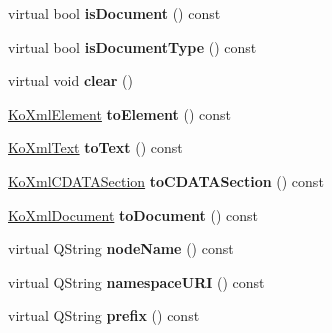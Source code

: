 \begin{DoxyCompactItemize}
\item 
\hypertarget{classKoXmlNode_a72089a94f37917bdc8896368c83c75dd}{
virtual bool {\bfseries isDocument} () const }
\label{classKoXmlNode_a72089a94f37917bdc8896368c83c75dd}

\item 
\hypertarget{classKoXmlNode_ac959bde05fba69bc9593e45e8862e7fd}{
virtual bool {\bfseries isDocumentType} () const }
\label{classKoXmlNode_ac959bde05fba69bc9593e45e8862e7fd}

\item 
\hypertarget{classKoXmlNode_a514c6e4cca00c3cdd15b49b7256ccdca}{
virtual void {\bfseries clear} ()}
\label{classKoXmlNode_a514c6e4cca00c3cdd15b49b7256ccdca}

\item 
\hypertarget{classKoXmlNode_af4ecc91ee34dc96cce56baf014f33618}{
\hyperlink{classKoXmlElement}{KoXmlElement} {\bfseries toElement} () const }
\label{classKoXmlNode_af4ecc91ee34dc96cce56baf014f33618}

\item 
\hypertarget{classKoXmlNode_a0a59d93ef6d9470fd45eb4b9e9c36ef1}{
\hyperlink{classKoXmlText}{KoXmlText} {\bfseries toText} () const }
\label{classKoXmlNode_a0a59d93ef6d9470fd45eb4b9e9c36ef1}

\item 
\hypertarget{classKoXmlNode_ab78d1e67e9ebda2ea669e66d28e855d9}{
\hyperlink{classKoXmlCDATASection}{KoXmlCDATASection} {\bfseries toCDATASection} () const }
\label{classKoXmlNode_ab78d1e67e9ebda2ea669e66d28e855d9}

\item 
\hypertarget{classKoXmlNode_aa0abff287194be42fb8a481c00c0e9e6}{
\hyperlink{classKoXmlDocument}{KoXmlDocument} {\bfseries toDocument} () const }
\label{classKoXmlNode_aa0abff287194be42fb8a481c00c0e9e6}

\item 
\hypertarget{classKoXmlNode_aa20285fa94dca94fddc354564d0c88be}{
virtual QString {\bfseries nodeName} () const }
\label{classKoXmlNode_aa20285fa94dca94fddc354564d0c88be}

\item 
\hypertarget{classKoXmlNode_acb26ec1c77974dfa349e56f371ec21c5}{
virtual QString {\bfseries namespaceURI} () const }
\label{classKoXmlNode_acb26ec1c77974dfa349e56f371ec21c5}

\item 
\hypertarget{classKoXmlNode_a204cfe128f5b60d2f138e1733f457402}{
virtual QString {\bfseries prefix} () const }
\label{classKoXmlNode_a204cfe128f5b60d2f138e1733f457402}


\end{DoxyCompactItemize}
